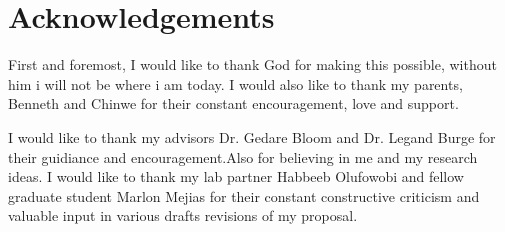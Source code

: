 

\chapter*{Acknowledgements}

 First and foremost, I would like to thank God for making this possible, without him i will not be where i am today. I would also like to thank my parents, Benneth and Chinwe for their constant encouragement, love and support.  \par I would like to thank my advisors Dr. Gedare Bloom and Dr. Legand Burge for their guidiance and encouragement.Also for believing in me and my research ideas. I would like to thank my lab partner Habbeeb Olufowobi and fellow graduate student Marlon Mejias for their constant constructive criticism and valuable input in various drafts revisions of my proposal.